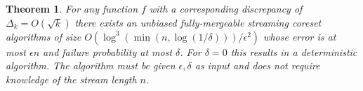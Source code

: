 \documentclass{article} %
\newtheorem{theorem}{Theorem}[section]
\newtheorem{fact}[theorem]{Fact}
\newcommand{\eps}{\epsilon}
\begin{document}
\begin{theorem}
For any function $f$ with a corresponding discrepancy of $\Delta_k = O(\sqrt{k})$ there exists an unbiased fully-mergeable streaming coreset algorithms of size 
$O\left(\log^3\left(\min(n, \log(1/\delta)) \right)/\eps^2\right)$ whose error is at most $\eps n$ and failure probability at most $\delta$. For $\delta=0$ this results in a deterministic algorithm. The algorithm must be given $\eps, \delta$ as input and does not require knowledge of the stream length $n$.
\end{theorem}
%
%
\end{document}
